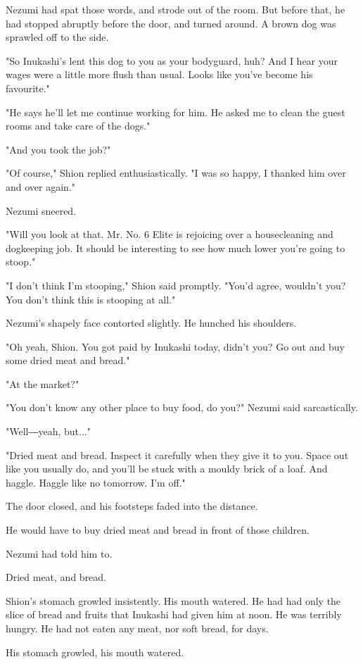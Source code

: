 Nezumi had spat those words, and strode out of the room. But before
that, he had stopped abruptly before the door, and turned around. A
brown dog was sprawled off to the side.

"So Inukashi's lent this dog to you as your bodyguard, huh? And I hear
your wages were a little more flush than usual. Looks like you've become
his favourite."

"He says he'll let me continue working for him. He asked me to clean the
guest rooms and take care of the dogs."

"And you took the job?"

"Of course," Shion replied enthusiastically. "I was so happy, I thanked
him over and over again."

Nezumi sneered.

"Will you look at that. Mr. No. 6 Elite is rejoicing over a
housecleaning and dogkeeping job. It should be interesting to see how
much lower you're going to stoop."

"I don't think I'm stooping," Shion said promptly. "You'd agree,
wouldn't you? You don't think this is stooping at all."

Nezumi's shapely face contorted slightly. He hunched his shoulders.

"Oh yeah, Shion. You got paid by Inukashi today, didn't you? Go out and
buy some dried meat and bread."

"At the market?"

"You don't know any other place to buy food, do you?" Nezumi said
sarcastically.

"Well―yeah, but..."

"Dried meat and bread. Inspect it carefully when they give it to you.
Space out like you usually do, and you'll be stuck with a mouldy brick
of a loaf. And haggle. Haggle like no tomorrow. I'm off."

The door closed, and his footsteps faded into the distance.

He would have to buy dried meat and bread in front of those children.

Nezumi had told him to.

Dried meat, and bread.

Shion's stomach growled insistently. His mouth watered. He had had only
the slice of bread and fruits that Inukashi had given him at noon. He
was terribly hungry. He had not eaten any meat, nor soft bread, for
days.

His stomach growled, his mouth watered.


